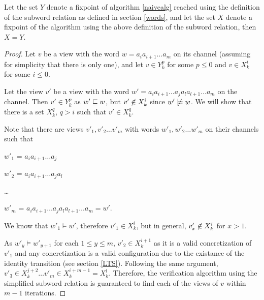 \begin{lemma}
Let the set $Y$ denote a fixpoint of algorithm \ref{naivealg} reached using the definition of the subword relation as defined in section \ref{words}, and let the set $X$ denote a fixpoint of the algorithm using the above definition of the subword relation, then $X=Y$.
\end{lemma}
\begin{proof}
Let $v$ be a view with the word $w = a_ia_{i+1}\ldots a_m$ on its channel (assuming for simplicity that there is only one), and let $v\in Y_k^p$ for some $p \leq 0$ and $v\in X_k^i$ for some $i \leq 0$.

Let the view $v'$ be a view with the word $w' = a_ia_{i+1}\ldots a_ja_la_{l+1}\ldots a_m$ on the channel. Then $v' \in Y_k^p$ as $w' \sqsubseteq w$, but $v' \centernot\in X_k^i$ since $w' \centernot\models w$. We will show that there is a set $X_k^q$, $q > i$ such that $v'\in X_k^q$.


Note that there are views $v'_1, v'_2\ldots v'_m$ with words $w'_1, w'_2\ldots w'_m$ on their channels such that

\hspace{10mm}
$w'_1$ =  $a_ia_{i+1}\ldots a_j$

\hspace{10mm}
$w'_2$ = $a_ia_{i+1}\ldots a_ja_l$

\hspace{10mm}
\ldots

\hspace{10mm}
$w'_{m}$ = $a_ia_{i+1}\ldots a_ja_la_{l+1}\ldots a_{m} = w'$.

We know that $w'_1 \models w'$, therefore $v'_1 \in X_k^{i}$, but in general, $v'_x \centernot\in X_k^i$ for $x > 1$.

As $w'_y \models w'_{y+1}$ for each $1 \leq y \leq m$, $v'_2 \in X_k^{i+1}$ as it is a valid concretization of $v'_1$ and any concretization is a valid configuration due to the existance of the identity transition (see section \ref {LTS}). Following the same argument, $v'_3 \in X_k^{j+2} \ldots v'_m \in X_k^{i+m-1} = X_k^l$. Therefore, the verification algorithm using the simplified subword relation is guaranteed to find each of the views of $v$ within $m-1$ iterations.


\end{proof}
